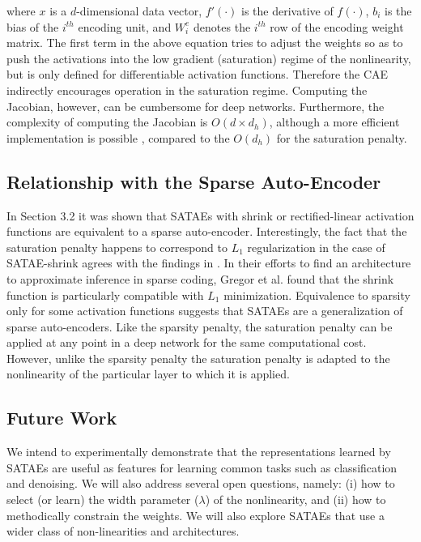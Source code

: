 \documentclass{article} %
\begin{document}
\noindent
where $x$ is a $d$-dimensional data vector, $f'(\cdot)$ is the derivative of $f(\cdot)$, $b_i$ is the bias of the $i^{th}$ encoding unit, and $W^e_i$ denotes the $i^{th}$ row of the encoding weight matrix. The first term in the above equation tries to adjust the weights so as to push the activations into the low gradient (saturation) regime of the nonlinearity, but is only defined for differentiable activation functions. Therefore the CAE indirectly encourages operation in the saturation regime. Computing the Jacobian, however, can be cumbersome for deep networks. Furthermore, the complexity of computing the Jacobian is $O(d \times d_h)$, although a more efficient implementation is possible \cite{CAE}, compared to the $O(d_h)$ for the saturation penalty.  

 
\subsection{Relationship with the Sparse Auto-Encoder}
In Section 3.2 it was shown that SATAEs with shrink or rectified-linear activation functions are equivalent to a sparse auto-encoder. Interestingly, the fact that the saturation penalty happens to correspond to $L_1$ regularization in the case of SATAE-shrink agrees with the findings in \cite{LISTA}. In their efforts to find an architecture to approximate inference in sparse coding, Gregor et al. found that the shrink function is particularly compatible with $L_1$ minimization. Equivalence to sparsity only for some activation functions suggests that SATAEs are a generalization of sparse auto-encoders. Like the sparsity penalty, the saturation penalty can be applied at any point in a deep network for the same computational cost. However, unlike the sparsity penalty the saturation penalty is adapted to the nonlinearity of the particular layer to which it is applied. 

\subsection{Future Work} 
We intend to experimentally demonstrate that the representations learned by SATAEs are useful as features for learning common tasks such as classification and denoising. We will also address several open questions, namely: (i) how to select (or learn) the width parameter ($\lambda$) of the nonlinearity, and (ii) how to methodically constrain the weights. We will also explore SATAEs that use a wider class of non-linearities and architectures. 
 
\end{document}
